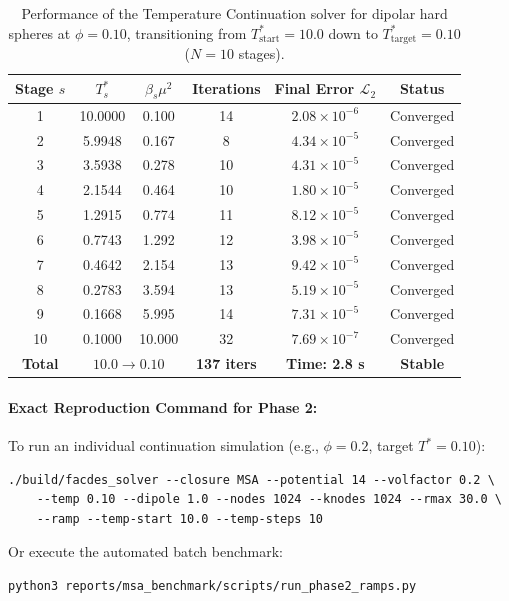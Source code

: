 \documentclass[11pt,a4paper]{article}
\begin{document}
\begin{table}[htbp]
    \centering
    \caption{Performance of the Temperature Continuation solver for dipolar hard spheres at $\phi = 0.10$, transitioning from $T_{\text{start}}^* = 10.0$ down to $T_{\text{target}}^* = 0.10$ ($N=10$ stages).}
    \label{tab:continuation}
    \vspace{2mm}
    \begin{tabular}{cccccc}
        \hline\hline
        Stage $s$ & $T_s^*$ & $\beta_s \mu^2$ & Iterations & Final Error $\mathcal{L}_2$ & Status \\
        \hline
        1 & 10.0000 & 0.100 & 14 & $2.08 \times 10^{-6}$ & Converged \\
        2 & 5.9948 & 0.167 & 8 & $4.34 \times 10^{-5}$ & Converged \\
        3 & 3.5938 & 0.278 & 10 & $4.31 \times 10^{-5}$ & Converged \\
        4 & 2.1544 & 0.464 & 10 & $1.80 \times 10^{-5}$ & Converged \\
        5 & 1.2915 & 0.774 & 11 & $8.12 \times 10^{-5}$ & Converged \\
        6 & 0.7743 & 1.292 & 12 & $3.98 \times 10^{-5}$ & Converged \\
        7 & 0.4642 & 2.154 & 13 & $9.42 \times 10^{-5}$ & Converged \\
        8 & 0.2783 & 3.594 & 13 & $5.19 \times 10^{-5}$ & Converged \\
        9 & 0.1668 & 5.995 & 14 & $7.31 \times 10^{-5}$ & Converged \\
        10 & 0.1000 & 10.000 & 32 & $7.69 \times 10^{-7}$ & Converged \\
        \hline
        \textbf{Total} & \multicolumn{2}{c}{$10.0 \to 0.10$} & \textbf{137 iters} & \textbf{Time: 2.8 s} & \textbf{Stable} \\
        \hline\hline
    \end{tabular}
\end{table}

\paragraph{Exact Reproduction Command for Phase 2:}
To run an individual continuation simulation (e.g., $\phi = 0.2$, target $T^* = 0.10$):
\begin{verbatim}
./build/facdes_solver --closure MSA --potential 14 --volfactor 0.2 \
    --temp 0.10 --dipole 1.0 --nodes 1024 --knodes 1024 --rmax 30.0 \
    --ramp --temp-start 10.0 --temp-steps 10
\end{verbatim}
Or execute the automated batch benchmark:
\begin{verbatim}
python3 reports/msa_benchmark/scripts/run_phase2_ramps.py
\end{verbatim}
\end{document}

